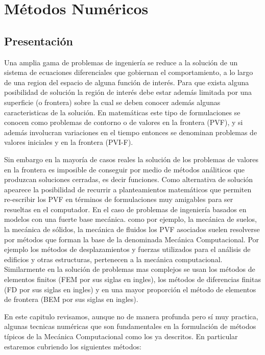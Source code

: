 \graphicspath{{img/metodos/}}
\chapter{Métodos Numéricos}

\section*{Presentación}

Una amplia gama de problemas de ingeniería se reduce a la solución de un sistema de ecuaciones diferenciales que gobiernan el comportamiento, a lo largo de una region del espacio de alguna función de interés. Para que exista alguna posibilidad de solución la región de interés debe estar además limitada por una superficie (o frontera) sobre la cual se deben conocer además algunas caracteristicas de la solución. En matemáticas este tipo de formulaciones se conocen como problemas de contorno o de valores en la frontera (PVF), y si además involucran variaciones en el tiempo entonces se denominan problemas de valores iniciales y en la frontera (PVI-F).

Sin embargo en la mayoría de casos reales la solución de los problemas de valores en la frontera es imposible de conseguir por medio de métodos análiticos que produzcan soluciones cerradas, es decir funciones. Como alternativa de solución apearece la posibilidad de recurrir a planteamientos matemáticos que permiten re-escribir los PVF en términos de formulaciones muy amigables para ser resueltas en el computador. En el caso de problemas de ingeniería basados en modelos con una fuerte base mecánica. como por ejemplo, la mecánica de suelos, la mecánica de sólidos, la mecánica de fluidos los PVF asociados suelen resolverse por métodos que forman la base de la denominada Mecánica Computacional. Por ejemplo los métodos de desplazamientos y fuerzas utilizados para el análisis de edificios y otras estructuras, pertenecen a la mecánica computacional. Similarmente en la solución de problemas mas complejos se usan los métodos de elementos finitos (FEM por sus siglas en ingles), los métodos de diferencias finitas (FD por sus siglas en ingles) y en una mayor proporción el método de elementos de frontera (BEM por sus siglas en ingles).

En este capitulo revisamos, aunque no de manera profunda pero sí muy practica, algunas tecnicas numéricas que son fundamentales en la formulación de métodos típicos de la Mecánica Computacional como los ya descritos. En particular estaremos cubriendo los siguientes métodos:

